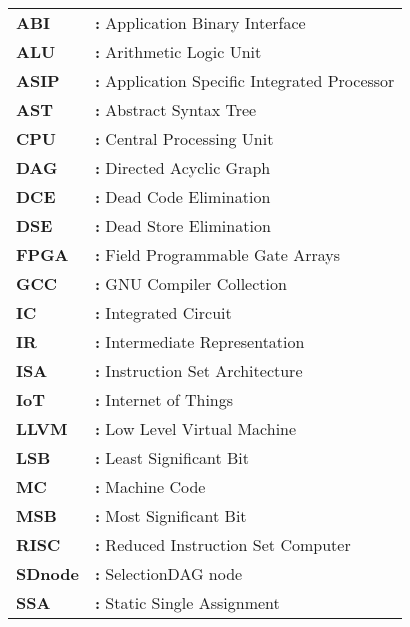 \begin{tabular}{@{}p{2cm}l}
{\bf{ABI}} & {\bf:} Application Binary Interface\\
{\bf ALU} & {\bf:} Arithmetic Logic Unit\\
{\bf ASIP} & {\bf:} Application Specific Integrated Processor\\
{\bf AST} & {\bf:} Abstract Syntax Tree\\
{\bf CPU} & {\bf:} Central Processing Unit\\
{\bf DAG} & {\bf:} Directed Acyclic Graph\\
{\bf DCE} & {\bf:} Dead Code Elimination\\
{\bf DSE} & {\bf:} Dead Store Elimination\\
{\bf FPGA} & {\bf:} Field Programmable Gate Arrays\\
{\bf GCC} & {\bf:} GNU Compiler Collection\\
{\bf IC} & {\bf:} Integrated Circuit\\
{\bf IR} & {\bf:} Intermediate Representation\\
{\bf ISA} & {\bf:} Instruction Set Architecture\\
{\bf IoT} & {\bf:} Internet of Things\\
{\bf LLVM} & {\bf:} Low Level Virtual Machine\\
{\bf LSB} & {\bf:} Least Significant Bit\\
{\bf MC} & {\bf:} Machine Code\\
{\bf MSB} & {\bf:} Most Significant Bit\\
{\bf RISC} & {\bf:} Reduced Instruction Set Computer\\
{\bf SDnode} & {\bf:} SelectionDAG node\\
{\bf SSA} & {\bf:} Static Single Assignment\\
\end{tabular}


